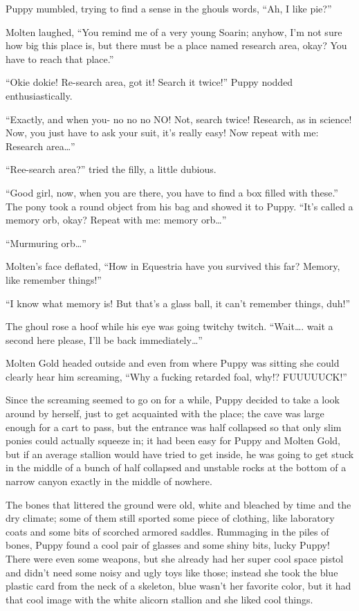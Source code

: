 Puppy mumbled, trying to find a sense in the ghouls words, ``Ah, I like pie?''

Molten laughed, ``You remind me of a very young Soarin; anyhow, I'm not sure how big this place is, but there must be a place named research area, okay? You have to reach that place.''

``Okie dokie! Re-search area, got it! Search it twice!'' Puppy nodded enthusiastically.

``Exactly, and when you- no no no NO! Not, search twice! Research, as in science! Now, you just have to ask your suit, it's really easy! Now repeat with me: Research area\dots''

``Ree-search area?'' tried the filly, a little dubious.

``Good girl, now, when you are there, you have to find a box filled with these.'' The pony took a round object from his bag and showed it to Puppy. ``It's called a memory orb, okay? Repeat with me: memory orb\dots''

``Murmuring orb\dots''

Molten's face deflated, ``How in Equestria have you survived this far? Memory, like remember things!''

``I know what memory is! But that's a glass ball, it can't remember things, duh!''

The ghoul rose a hoof while his eye was going twitchy twitch. ``Wait\dots. wait a second here please, I'll be back immediately\dots''

Molten Gold headed outside and even from where Puppy was sitting she could clearly hear him screaming, ``Why a fucking retarded foal, why!? FUUUUUCK!''

Since the screaming seemed to go on for a while, Puppy decided to take a look around by herself, just to get acquainted with the place; the cave was large enough for a cart to pass, but the entrance was half collapsed so that only slim ponies could actually squeeze in; it had been easy for Puppy and Molten Gold, but if an average stallion would have tried to get inside, he was going to get stuck in the middle of a bunch of half collapsed and unstable rocks at the bottom of a narrow canyon exactly in the middle of nowhere.

The bones that littered the ground were old, white and bleached by time and the dry climate; some of them still sported some piece of clothing, like laboratory coats and some bits of scorched armored saddles. Rummaging in the piles of bones, Puppy found a cool pair of glasses and some shiny bits, lucky Puppy! There were even some weapons, but she already had her super cool space pistol and didn't need some noisy and ugly toys like those; instead she took the blue plastic card from the neck of a skeleton, blue wasn't her favorite color, but it had that cool image with the white alicorn stallion and she liked cool things.

